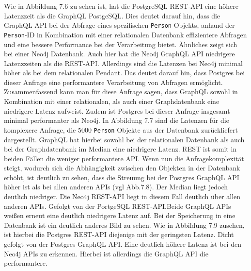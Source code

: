 \noindent
Wie in Abbildung 7.6 zu sehen ist, hat die PostgreSQL REST-API eine höhere Latenzzeit als die GraphQL PostgeSQL. Dies deutet darauf hin, dass die GraphQL API bei der Abfrage eines spezifischen \texttt{Person} Objekts, anhand der \texttt{Person}-ID in Kombination mit einer relationalen Datenbank effizientere Abfragen und eine bessere Performance bei der Verarbeitung bietet. Ähnliches zeigt sich bei einer Neo4j Datenbank. Auch hier hat die Neo4j GraphQL API niedrigere Latenzzeiten als die REST-API. Allerdings sind die Latenzen bei Neo4j minimal höher als bei dem relationalen Pendant. Das deutet darauf hin, dass Postgres bei dieser Anfrage eine performantere Verarbeitung von Abfragen ermöglicht. Zusammenfassend kann man für diese Anfrage sagen, dass GraphQL sowohl in Kombination mit einer relationalen, als auch einer Graphdatenbank eine niedrigere Latenz aufweist. Zudem ist Postgres bei dieser Anfrage insgesamt minimal performanter als Neo4j.
\newline
In Abbildung 7.7 sind die Latenzen für die komplexere Anfrage, die 5000 \texttt{Person} Objekte aus der Datenbank zurückliefert dargestellt. GraphQL hat hierbei sowohl bei der relationalen Datenbank als auch bei der Graphdatenbank im Median eine niedrigere Latenz. REST ist somit in beiden Fällen die weniger performantere API.
\newline
Wenn nun die Anfragekomplexität steigt, wodurch sich die Abhängigkeit zwischen den Objekten in der Datenbank erhöht, ist deutlich zu sehen, dass die Streuung bei der Postgres GraphQL API höher ist als bei allen anderen APIs (vgl Abb.7.8). Der Median liegt jedoch deutlich niedriger. Die Neo4j REST-API liegt in diesem Fall deutlich über allen anderen APIs. Gefolgt von der PortgeSQL REST-API.Beide GraphQL APIs weißen erneut eine deutlich niedrigere Latenz auf.
\newline
Bei der Speicherung in eine Datenbank ist ein deutlich anderes Bild zu sehen. Wie in Abbildung 7.9 zusehen, ist hierbei die Postgres REST-API diejenige mit der geringsten Latenz. Dicht gefolgt von der Postgres GraphQL API. Eine deutlich höhere Latenz ist bei den Neo4j APIs zu erkennen. Hierbei ist allerdings die GraphQL API die performantere.


